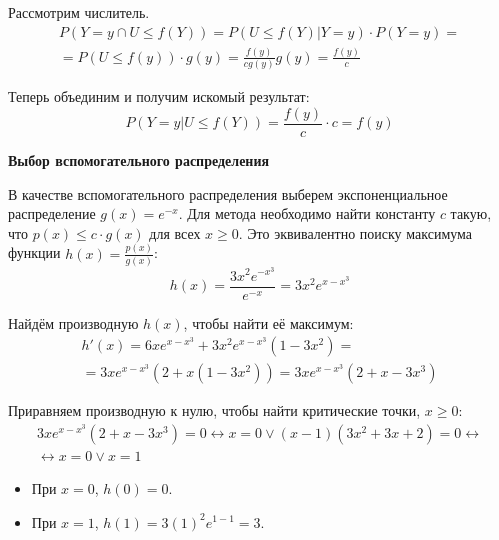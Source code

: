\documentclass[a4paper,14pt]{extarticle}
\begin{document}
                    Рассмотрим числитель.
                    \begin{gather*}
                            P(Y = y \cap U\le f(Y)) = P(U\le f(Y) | Y = y) \cdot P (Y = y) =\\
                            = P(U\le f(y)) \cdot g(y) =
                            \frac{f(y)}{cg(y)}g(y) = \frac{f(y)}{c}
                    \end{gather*}
                    
                    Теперь объединим и получим искомый результат:
                    \[
                    P(Y=y|U\le f(Y)) =
                    \frac{f(y)}{c}\cdot c = f(y)
                    \]
                    
                    \textbf{Выбор вспомогательного распределения}
                    
                    В качестве вспомогательного распределения выберем экспоненциальное распределение $g(x) = e^{-x}$.
                    Для метода необходимо найти константу $c$ такую, что $p(x) \leq c \cdot g(x)$ для всех $x \geq 0$.
                    Это эквивалентно поиску максимума функции $h(x) = \frac{p(x)}{g(x)}$:
                    \[
                    h(x) = \frac{3x^2 e^{-x^3}}{e^{-x}} = 3x^2 e^{x - x^3}
                    \]
                    
                    Найдём производную $h(x)$, чтобы найти её максимум:
                    \begin{gather*}
                            h'(x) = 6x e^{x - x^3} + 3x^2 e^{x - x^3} (1 - 3x^2) = \\
                            = 3x e^{x - x^3} (2 + x(1 - 3x^2)) = 3x e^{x - x^3} (2 + x - 3x^3)
                    \end{gather*}
                    
                    Приравняем производную к нулю, чтобы найти критические точки, $x \geq 0$:
                    \begin {gather*}
                            3x e^{x - x^3} (2 + x - 3x^3) = 0 \leftrightarrow
                            x = 0 \lor (x-1)(3x^2 + 3x + 2) = 0 \leftrightarrow \\
                            \leftrightarrow x = 0 \lor x = 1
                    \end{gather*}
                    
                    \begin{itemize}
                            \item При $x=0$, $h(0) = 0$.
                            \item При $x=1$, $h(1) = 3(1)^2 e^{1-1} = 3$.
                    \end{itemize}
                    
\end{document}
